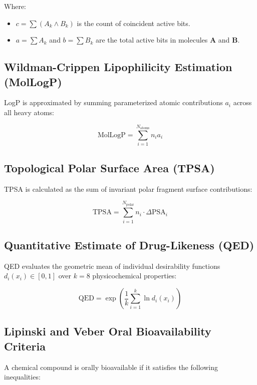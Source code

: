 \documentclass[11pt,a4paper]{article}
\begin{document}
\noindent Where:
\begin{itemize}
    \item $c = \sum (A_k \land B_k)$ is the count of coincident active bits.
    \item $a = \sum A_k$ and $b = \sum B_k$ are the total active bits in molecules $\mathbf{A}$ and $\mathbf{B}$.
\end{itemize}

\subsection{Wildman-Crippen Lipophilicity Estimation (MolLogP)}
LogP is approximated by summing parameterized atomic contributions $a_i$ across all heavy atoms:

\begin{equation}
\label{eq:logp}
\text{MolLogP} = \sum_{i=1}^{N_{\text{atoms}}} n_i a_i
\end{equation}

\subsection{Topological Polar Surface Area (TPSA)}
TPSA is calculated as the sum of invariant polar fragment surface contributions:

\begin{equation}
\label{eq:tpsa}
\text{TPSA} = \sum_{i=1}^{N_{\text{polar}}} n_i \cdot \Delta \text{PSA}_i
\end{equation}

\subsection{Quantitative Estimate of Drug-Likeness (QED)}
QED evaluates the geometric mean of individual desirability functions $d_i(x_i) \in [0, 1]$ over $k = 8$ physicochemical properties:

\begin{equation}
\label{eq:qed}
\text{QED} = \exp\left( \frac{1}{k} \sum_{i=1}^{k} \ln d_i(x_i) \right)
\end{equation}

\subsection{Lipinski and Veber Oral Bioavailability Criteria}
A chemical compound is orally bioavailable if it satisfies the following inequalities:
\end{document}
